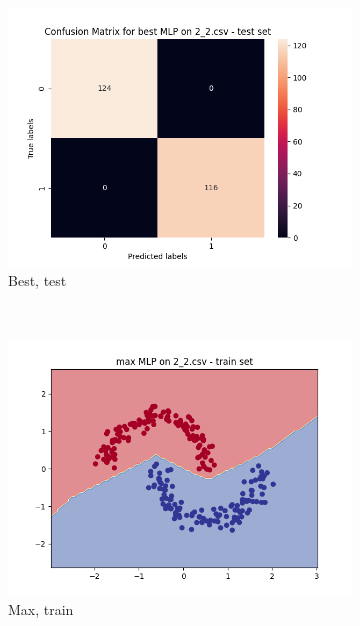 \documentclass[12pt]{article}
\newcommand*{\subfigwidth}{0.24\textwidth}
\begin{document}
\begin{figure}[H]
\begin{subfigure}[t]{\subfigwidth}
        \includegraphics[width=\linewidth]{img/exp_2/mlp/2_2/best/test_matrix.png}
        \caption{Best, test}
    \end{subfigure} 
    \\
    \begin{subfigure}[t]{\subfigwidth}
        \includegraphics[width=\linewidth]{img/exp_2/mlp/2_2/max/train_boundary.png}
        \caption{Max, train}
    \end{subfigure}
    \hfill
    \begin{subfigure}[t]{\subfigwidth}

\end{subfigure}
\end{figure}
\end{document}
